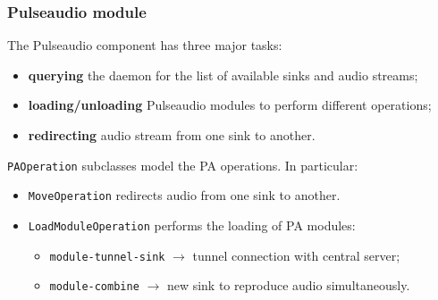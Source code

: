 \documentclass{beamer}
\begin{document}
	\begin{frame}
		\frametitle{Pulseaudio module}
		The Pulseaudio component has three major tasks:
		\begin{itemize}
		\item \textbf{querying} the daemon for the list of available sinks and audio streams; 
		\item \textbf{loading/unloading} Pulseaudio modules to perform different operations;
		\item \textbf{redirecting} audio stream from one sink to another.
		\end{itemize}
		\texttt{PAOperation} subclasses model the PA operations. In particular: \\
		\begin{itemize}
		\item \texttt{MoveOperation} redirects audio from one sink to another.
		\item \texttt{LoadModuleOperation} performs the loading of PA modules:
			\begin{itemize}
			\item \texttt{module-tunnel-sink} $\rightarrow$ tunnel connection with central server;
			\item \texttt{module-combine} $\rightarrow$ new sink to reproduce audio simultaneously.
			\end{itemize}
		\end{itemize}
	
	\end{frame}
	
\end{document}
